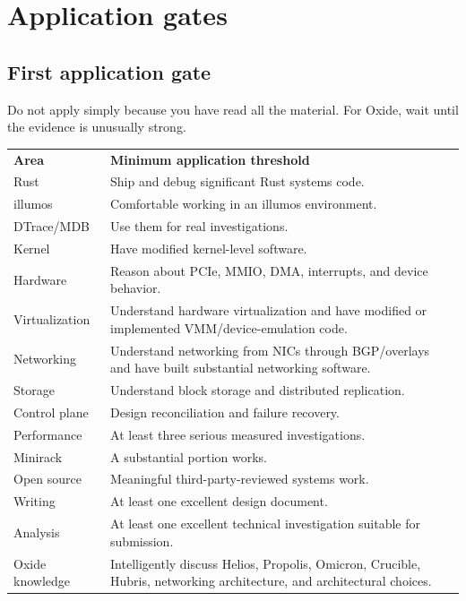 \documentclass[11pt,letterpaper]{article}
\begin{document}
\section{Application gates}\label{sec:19}

\subsection*{First application gate}

Do not apply simply because you have read all the material. For Oxide, wait until the evidence is unusually strong.

\begin{center}
\small
\begin{tabular}{>{\raggedright\arraybackslash}p{}>{\raggedright\arraybackslash}p{}}
\textbf{Area} & \textbf{Minimum application threshold} \\
Rust & Ship and debug significant Rust systems code. \\
illumos & Comfortable working in an illumos environment. \\
DTrace/MDB & Use them for real investigations. \\
Kernel & Have modified kernel-level software. \\
Hardware & Reason about PCIe, MMIO, DMA, interrupts, and device behavior. \\
Virtualization & Understand hardware virtualization and have modified or implemented VMM/device-emulation code. \\
Networking & Understand networking from NICs through BGP/overlays and have built substantial networking software. \\
Storage & Understand block storage and distributed replication. \\
Control plane & Design reconciliation and failure recovery. \\
Performance & At least three serious measured investigations. \\
Minirack & A substantial portion works. \\
Open source & Meaningful third-party-reviewed systems work. \\
Writing & At least one excellent design document. \\
Analysis & At least one excellent technical investigation suitable for submission. \\
Oxide knowledge & Intelligently discuss Helios, Propolis, Omicron, Crucible, Hubris, networking architecture, and architectural choices. \\
\end{tabular}
\end{center}
\end{document}
